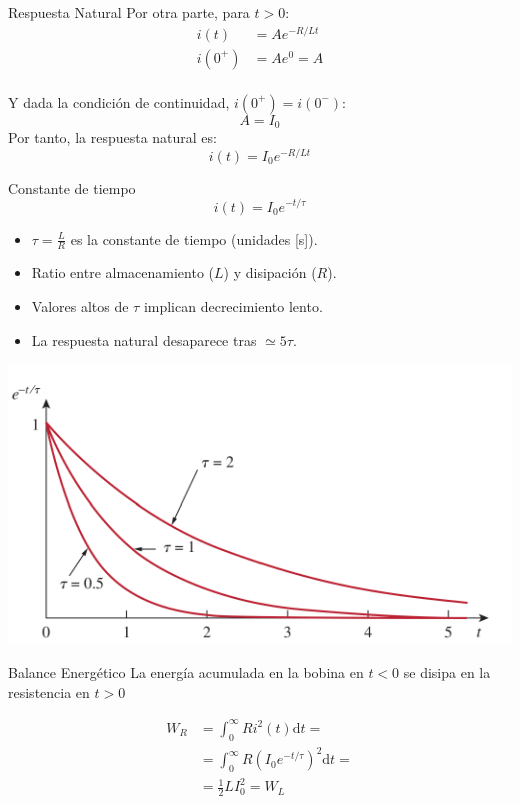 \documentclass[aspectratio=169, usenames,svgnames,dvipsnames]{beamer}
\begin{document}
\begin{frame}[label={sec:org01bc563}]{Respuesta Natural}
Por otra parte, para \(t > 0\):
\begin{align*}
  i(t) &= A e^{-R/L t}\\
  i(0^+) &= A e^0 = A\\
\end{align*}

Y dada la condición de continuidad, \(i(0^+) = i(0^-)\):
\[
  A = I_0
\]
Por tanto, la respuesta natural es:
\[
  \boxed{i(t) = I_0 e^{-R/L t}}
\]
\end{frame}



\begin{frame}[label={sec:orgc46478b}]{Constante de tiempo}
\[
  \boxed{i(t) = I_0 e^{-t/\tau}}
\]

\begin{itemize}
\item \(\tau = \frac{L}{R}\) es la constante de tiempo (unidades [s]).
\item Ratio entre almacenamiento (\(L\)) y disipación (\(R\)).
\item Valores altos de \(\tau\) implican decrecimiento lento.
\item La respuesta natural \guillemotleft{}desaparece\guillemotright{} tras \(\simeq 5\tau\).
\end{itemize}
\begin{center}
\includegraphics[height=0.5\textheight]{figs/constante_tiempo.pdf}
\end{center}
\end{frame}

\begin{frame}[label={sec:org0c07241}]{Balance Energético}
La energía acumulada en la bobina en \(t < 0\) se disipa en la resistencia en \(t > 0\)

\begin{align*}
  W_R &= \int_0^\infty R i^2(t)  \mathrm{d}t =\\
  &= \int_0^\infty R (I_0 e^{-t/\tau})^2  \mathrm{d}t = \\
  &= \frac{1}{2} L I_0^2 = W_L  
\end{align*}
\end{frame}
\end{document}
